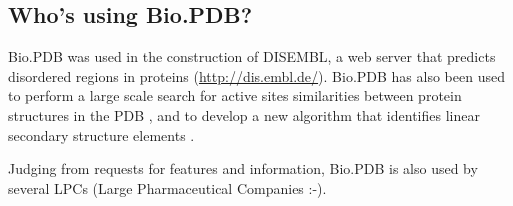 \subsection{Who's using Bio.PDB?}

Bio.PDB was used in the construction of DISEMBL, a web server that
predicts disordered regions in proteins (\url{http://dis.embl.de/}). Bio.PDB has also been used to
perform a large scale search for active sites similarities between
protein structures in the PDB \cite[Hamelryck, 2003]{hamelryck2003b}, and to develop a new algorithm
that identifies linear secondary structure elements \cite[Majumdar \textit{et al.}, 2005]{majumdar2005}.

Judging from requests for features and information, Bio.PDB is also
used by several LPCs (Large Pharmaceutical Companies :-).

